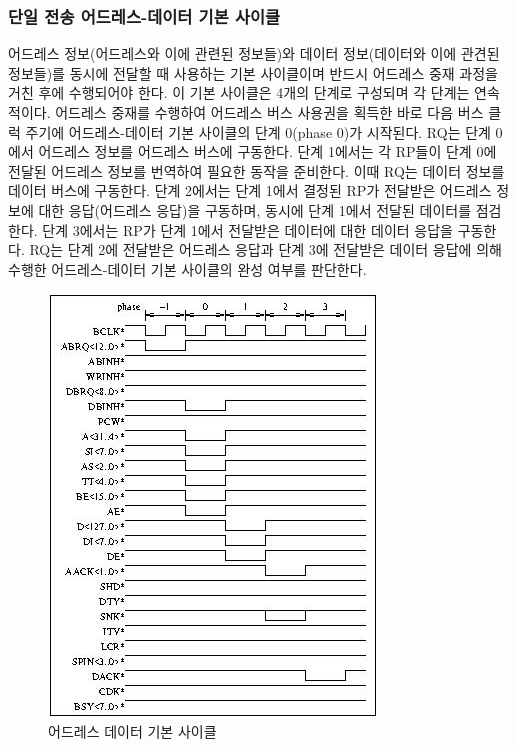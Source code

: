 \subsubsection{단일 전송 어드레스-데이터 기본 사이클}
어드레스 정보(어드레스와 이에 관련된 정보들)와 데이터 정보(데이터와 이에 관견된 정보들)를
동시에 전달할 때 사용하는
기본 사이클이며 반드시 어드레스 중재 과정을 거친 후에 수행되어야 한다.
이 기본 사이클은 4개의 단계로 구성되며 각 단계는 연속적이다.
어드레스 중재를 수행하여 어드레스 버스 사용권을 획득한 바로 다음 버스 클럭 주기에 어드레스-데이터 기본 사이클의
단계 0(phase 0)가 시작된다. RQ는 단계 0에서 어드레스 정보를
어드레스 버스에 구동한다. 단계 1에서는 각 RP들이 단계 0에 전달된 어드레스 정보를 번역하여
필요한 동작을 준비한다. 이때 RQ는 데이터 정보를 데이터 버스에 구동한다.
단계 2에서는 단계 1에서 결정된 RP가 전달받은 어드레스 정보에 대한 응답(어드레스 응답)을 구동하며,
동시에 단계 1에서 전달된 데이터를 점검한다.
단계 3에서는 RP가 단계 1에서 전달받은 데이터에 대한 데이터 응답을 구동한다.
RQ는 단계 2에 전달받은 어드레스 응답과 단계 3에 전달받은 데이터 응답에 의해
수행한 어드레스-데이터 기본 사이클의 완성 여부를 판단한다.
%
\begin{figure}[hp]
   \centerline{\includegraphics{ch3/FIG/single-add-data-basic.jpg}}
   \caption{어드레스 데이터 기본 사이클}\label{figure:single-add-data-basic}
\end{figure}
